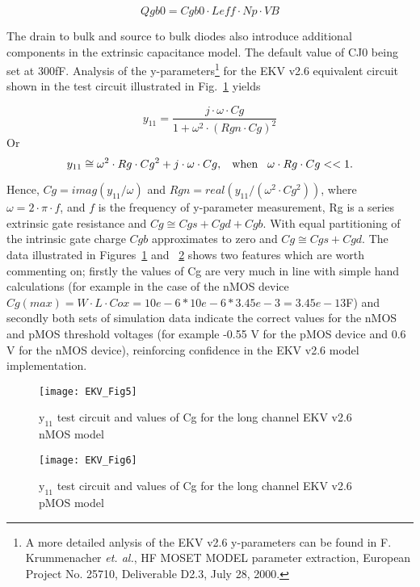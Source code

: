 \hspace{20mm}     \begin{equation} 
			Qgb0 = Cgb0 \cdot Leff \cdot Np \cdot VB
                  \end{equation}  

The drain to bulk and source to bulk diodes also introduce additional
components in the extrinsic capacitance model. The default value of
CJ0 being set at 300fF.  Analysis of the y-parameters\footnote{A more
detailed anlysis of the EKV v2.6 y-parameters can be found in
F. Krummenacher \textit{et. al.}, HF MOSET MODEL parameter extraction,
European Project No. 25710, Deliverable D2.3, July 28, 2000.} for the
EKV v2.6 equivalent circuit shown in the test circuit illustrated in
Fig.~\ref{fig:EKV5} yields

\hspace{20mm}     \begin{equation} 
			y_{11} = \dfrac{j \cdot \omega \cdot Cg}{1+\omega^{2} \cdot (Rgn \cdot Cg)^{2}}
                  \end{equation}  
Or
\hspace{20mm}     \begin{equation} 
			y_{11} \cong \omega^{2} \cdot Rg \cdot Cg^{2} + j \cdot \omega \cdot Cg, \hspace{3mm} \textrm{when} \hspace{3mm} \omega \cdot Rg \cdot Cg << 1.
                  \end{equation}  

Hence, $ Cg = imag( y_{11}/ \omega)$ and $Rgn = real( y_{11}/(
\omega^{2} \cdot Cg^{2}))$, where $\omega = 2 \cdot \pi \cdot f$, and $f$
is the frequency of y-parameter measurement, Rg is a series extrinsic
gate resistance and $Cg \cong Cgs + Cgd + Cgb$.  With equal
partitioning of the intrinsic gate charge $Cgb$ approximates to zero
and $Cg \cong Cgs + Cgd$. The data illustrated in
Figures~\ref{fig:EKV5} and ~\ref{fig:EKV6} shows two features which
are worth commenting on; firstly the values of Cg are very much in
line with simple hand calculations (for example in the case of the
nMOS device $Cg(max) = W \cdot L \cdot Cox = 10e-6 * 10e-6* 3.45e-3 =
3.45e-13$F) and secondly both sets of simulation data indicate the
correct values for the nMOS and pMOS threshold voltages (for example
-0.55 V for the pMOS device and 0.6 V for the nMOS device),
reinforcing confidence in the EKV v2.6 model implementation.

\begin{figure} 
  \centering
  \texttt{[image: EKV\_Fig5]}
  \caption{$\mathrm{y_{11}}$ test circuit and values of Cg for the long channel EKV v2.6 nMOS model}
  \label{fig:EKV5}
\end{figure} 
\begin{figure}
  \centering
  \texttt{[image: EKV\_Fig6]}
  \caption{$\mathrm{y_{11}}$ test circuit and values of Cg for the long channel EKV v2.6 pMOS model}
  \label{fig:EKV6}
\end{figure}  



